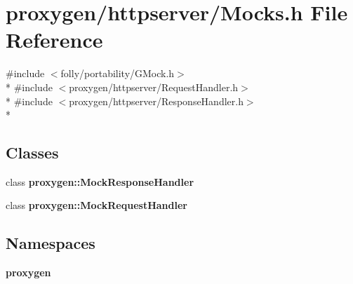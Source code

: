 \section{proxygen/httpserver/\+Mocks.h File Reference}
\label{Mocks_8h}
{\ttfamily \#include $<$folly/portability/\+G\+Mock.\+h$>$}\\*
{\ttfamily \#include $<$proxygen/httpserver/\+Request\+Handler.\+h$>$}\\*
{\ttfamily \#include $<$proxygen/httpserver/\+Response\+Handler.\+h$>$}\\*
\subsection*{Classes}
\begin{DoxyCompactItemize}
\item 
class {\bf proxygen\+::\+Mock\+Response\+Handler}
\item 
class {\bf proxygen\+::\+Mock\+Request\+Handler}
\end{DoxyCompactItemize}
\subsection*{Namespaces}
\begin{DoxyCompactItemize}
\item 
 {\bf proxygen}
\end{DoxyCompactItemize}
